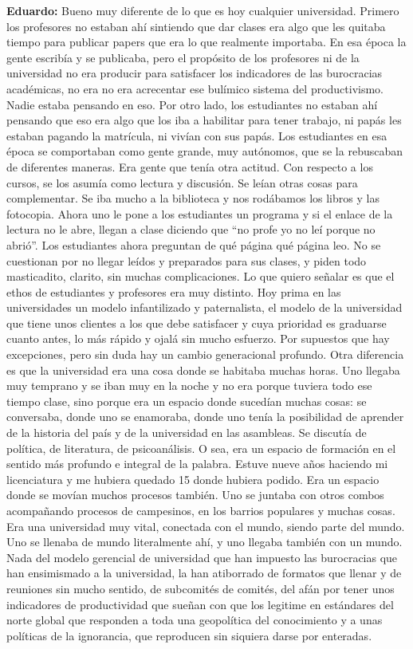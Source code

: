 \documentclass[
]{interact}
\begin{document}
\textbf{Eduardo:} Bueno muy diferente de lo que es hoy cualquier
universidad. Primero los profesores no estaban ahí sintiendo que dar
clases era algo que les quitaba tiempo para publicar papers que era lo
que realmente importaba. En esa época la gente escribía y se publicaba,
pero el propósito de los profesores ni de la universidad no era producir
para satisfacer los indicadores de las burocracias académicas, no era no
era acrecentar ese bulímico sistema del productivismo. Nadie estaba
pensando en eso. Por otro lado, los estudiantes no estaban ahí pensando
que eso era algo que los iba a habilitar para tener trabajo, ni papás
les estaban pagando la matrícula, ni vivían con sus papás. Los
estudiantes en esa época se comportaban como gente grande, muy
autónomos, que se la rebuscaban de diferentes maneras. Era gente que
tenía otra actitud. Con respecto a los cursos, se los asumía como
lectura y discusión. Se leían otras cosas para complementar. Se iba
mucho a la biblioteca y nos rodábamos los libros y las fotocopia. Ahora
uno le pone a los estudiantes un programa y si el enlace de la lectura
no le abre, llegan a clase diciendo que ``no profe yo no leí porque no
abrió''. Los estudiantes ahora preguntan de qué página qué página leo.
No se cuestionan por no llegar leídos y preparados para sus clases, y
piden todo masticadito, clarito, sin muchas complicaciones. Lo que
quiero señalar es que el ethos de estudiantes y profesores era muy
distinto. Hoy prima en las universidades un modelo infantilizado y
paternalista, el modelo de la universidad que tiene unos clientes a los
que debe satisfacer y cuya prioridad es graduarse cuanto antes, lo más
rápido y ojalá sin mucho esfuerzo. Por supuestos que hay excepciones,
pero sin duda hay un cambio generacional profundo. Otra diferencia es
que la universidad era una cosa donde se habitaba muchas horas. Uno
llegaba muy temprano y se iban muy en la noche y no era porque tuviera
todo ese tiempo clase, sino porque era un espacio donde sucedían muchas
cosas: se conversaba, donde uno se enamoraba, donde uno tenía la
posibilidad de aprender de la historia del país y de la universidad en
las asambleas. Se discutía de política, de literatura, de psicoanálisis.
O sea, era un espacio de formación en el sentido más profundo e integral
de la palabra. Estuve nueve años haciendo mi licenciatura y me hubiera
quedado 15 donde hubiera podido. Era un espacio donde se movían muchos
procesos también. Uno se juntaba con otros combos acompañando procesos
de campesinos, en los barrios populares y muchas cosas. Era una
universidad muy vital, conectada con el mundo, siendo parte del mundo.
Uno se llenaba de mundo literalmente ahí, y uno llegaba también con un
mundo. Nada del modelo gerencial de universidad que han impuesto las
burocracias que han ensimismado a la universidad, la han atiborrado de
formatos que llenar y de reuniones sin mucho sentido, de subcomités de
comités, del afán por tener unos indicadores de productividad que sueñan
con que los legitime en estándares del norte global que responden a toda
una geopolítica del conocimiento y a unas políticas de la ignorancia,
que reproducen sin siquiera darse por enteradas.
\end{document}
